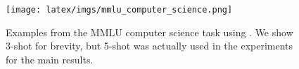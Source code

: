 \begin{figure}[th!]
\centering
\texttt{[image: latex/imgs/mmlu\_computer\_science.png]}
\caption{Examples from the MMLU computer science task using \wicd.  We show 3-shot for brevity, but 5-shot was actually used in the experiments for the main results.}
\label{fig:mmlu-cs-examples}
\end{figure} 